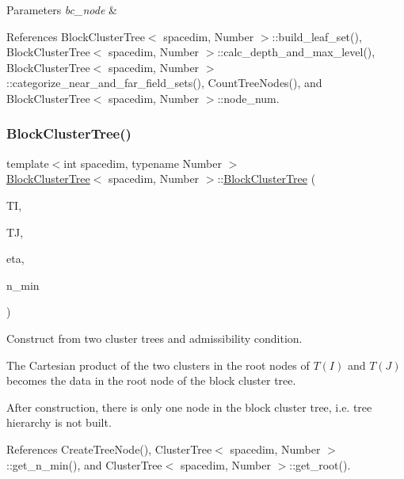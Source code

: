 \begin{DoxyParams}{Parameters}
{\em bc\+\_\+node} & \\
\hline
\end{DoxyParams}


References Block\+Cluster\+Tree$<$ spacedim, Number $>$\+::build\+\_\+leaf\+\_\+set(), Block\+Cluster\+Tree$<$ spacedim, Number $>$\+::calc\+\_\+depth\+\_\+and\+\_\+max\+\_\+level(), Block\+Cluster\+Tree$<$ spacedim, Number $>$\+::categorize\+\_\+near\+\_\+and\+\_\+far\+\_\+field\+\_\+sets(), Count\+Tree\+Nodes(), and Block\+Cluster\+Tree$<$ spacedim, Number $>$\+::node\+\_\+num.

\mbox{\label{classBlockClusterTree_aefb93288ece0e153eb5843d1df21a2a6}} 
\subsubsection{\texorpdfstring{Block\+Cluster\+Tree()}{BlockClusterTree()}\hspace{0.1cm}{\footnotesize\ttfamily [6/8]}}
{\footnotesize\ttfamily template$<$int spacedim, typename Number $>$ \\
\hyperlink{classBlockClusterTree}{Block\+Cluster\+Tree}$<$ spacedim, Number $>$\+::\hyperlink{classBlockClusterTree}{Block\+Cluster\+Tree} (\begin{DoxyParamCaption}\item[{const \hyperlink{classClusterTree}{Cluster\+Tree}$<$ spacedim, Number $>$ \&}]{TI,  }\item[{const \hyperlink{classClusterTree}{Cluster\+Tree}$<$ spacedim, Number $>$ \&}]{TJ,  }\item[{const Number}]{eta,  }\item[{const unsigned int}]{n\+\_\+min }\end{DoxyParamCaption})}

Construct from two cluster trees and admissibility condition.

The Cartesian product of the two clusters in the root nodes of $T(I)$ and $T(J)$ becomes the data in the root node of the block cluster tree.

After construction, there is only one node in the block cluster tree, i.\+e. tree hierarchy is not built. 

References Create\+Tree\+Node(), Cluster\+Tree$<$ spacedim, Number $>$\+::get\+\_\+n\+\_\+min(), and Cluster\+Tree$<$ spacedim, Number $>$\+::get\+\_\+root().

